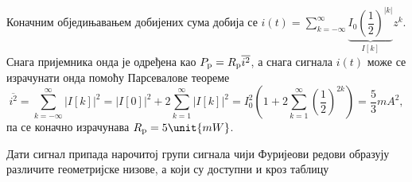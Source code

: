 Коначним обједињавањем добијених сума добија се 
$i(t) = \sum_{ k = -\infty }^{\infty} \underbrace{ I_0 \left(\dfrac{1}{2}\right)^{|k|}}_{I[k]} z^k$. Снага пријемника 
онда је одређена као 
$P_{\rm p} = R_{\rm p} \overline{i^2}$, а снага сигнала $i(t)$ 
може се израчунати онда помоћу Парсевалове теореме 
\begin{equation}
    \overline{i^2} = \sum_{k = -\infty}^{\infty} |I[k]|^2 = 
    |I[0]|^2 + 2 \sum_{k = 1}^{\infty} |I[k]|^2 =   
    I_0^2 \left( 1 + 2 \sum_{k = 1}^{\infty} \left(\dfrac{1}{2} \right)^{2k} \right) = \dfrac{5}{3} \unit{mA^2},
\end{equation}
па се коначно израчунава $R_{\rm p} = 5\unit{mW}$. 

Дати сигнал припада нарочитој групи сигнала чији
Фуријеови редови образују различите геометријске низове, а који су доступни и кроз таблицу 
